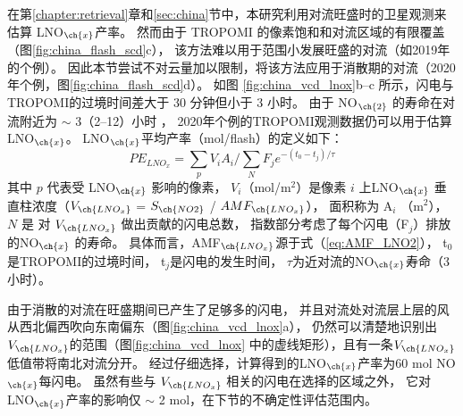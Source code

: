 在第\ref{chapter:retrieval}章和\ref{sec:china}节中，本研究利用对流旺盛时的卫星观测来估算 LNO$_{\ch{x}}$产率。
然而由于 TROPOMI 的像素饱和和对流区域的有限覆盖（图\ref{fig:china_flash_scd}c），
该方法难以用于范围小发展旺盛的对流（如2019年的个例）。
因此本节尝试不对云量加以限制，将该方法应用于消散期的对流（2020年个例，图\ref{fig:china_flash_scd}d）。
如图 \ref{fig:china_vcd_lnox}b--c 所示，闪电与TROPOMI的过境时间差大于 30 分钟但小于 3 小时。
由于 NO$_{\ch{2}}$ 的寿命在对流附近为 $\sim$ 3（2--12）小时 \citep{Nault.2016}，
2020年个例的TROPOMI观测数据仍可以用于估算LNO$_{\ch{x}}$。
LNO$_{\ch{x}}$平均产率（mol/flash）的定义如下：
\begin{equation} \label{eq:lnox}
PE_{LNO_x} = \sum_{p} V_i A_i / \sum_{N} F_j e^{-(t_0 - t_j) / \tau}
\end{equation}
其中 $p$ 代表受 LNO$_{\ch{x}}$ 影响的像素，
$V_i$（mol/m$^2$）是像素 $i$ 上LNO$_{\ch{x}}$ 垂直柱浓度（$V_{\ch{LNO_x}}$ = $S_{\ch{NO2}}$ / $AMF_{\ch{LNO_x}}$），
面积称为 A$_i$ （m$^2$），
$N$ 是 对 $V_{\ch{LNO_x}}$ 做出贡献的闪电总数，
指数部分考虑了每个闪电（F$_j$）排放的NO$_{\ch{x}}$ 的寿命。
具体而言，AMF$_{\ch{LNO_x}}$源于式（\ref{eq:AMF_LNO2}），
t$_0$是TROPOMI的过境时间，
t$_j$是闪电的发生时间，
$\tau$为近对流的NO$_{\ch{x}}$寿命（3 小时）。

由于消散的对流在旺盛期间已产生了足够多的闪电，
并且对流处对流层上层的风从西北偏西吹向东南偏东（图\ref{fig:china_vcd_lnox}a），
仍然可以清楚地识别出$V_{\ch{LNO_x}}$的范围（图\ref{fig:china_vcd_lnox} 中的虚线矩形），且有一条$V_{\ch{LNO_x}}$低值带将南北对流分开。
经过仔细选择，计算得到的LNO$_{\ch{x}}$产率为60 mol NO$_{\ch{x}}$每闪电。
虽然有些与 $V_{\ch{LNO_x}}$ 相关的闪电在选择的区域之外，
它对LNO$_{\ch{x}}$产率的影响仅 $\sim$ 2 mol，在下节的不确定性评估范围内。




